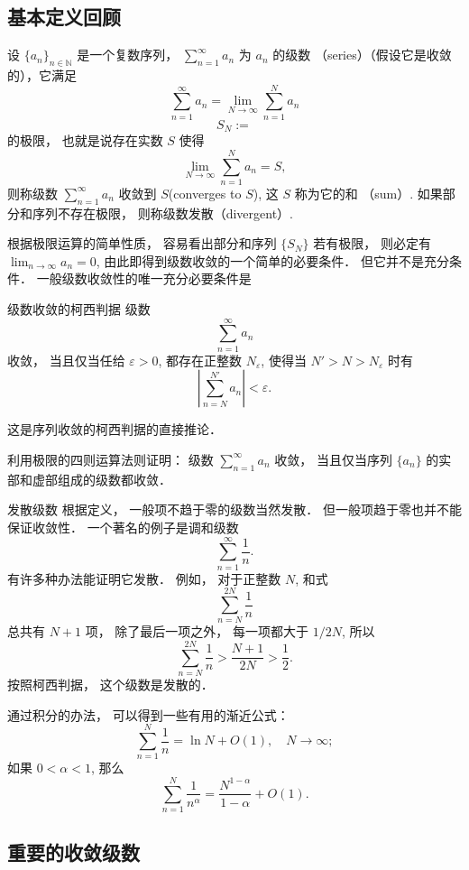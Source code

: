 


\subsection{基本定义回顾}
设 $\{a_n\}_{n\in\mathbb{N}}$ 是一个复数序列， $\sum_{n=1}^\infty a_n$ 为 $a_n$ 的级数 （series）（假设它是收敛的），它满足
$$
\sum_{n=1}^\infty a_n = \lim_{N \to \infty} \sum_{n=1}^N a_n
$$
\[
S_N:=
\]
的极限， 也就是说存在实数 $S$ 使得
\[
\lim_{N\to\infty}\sum_{n=1}^N a_n=S,
\] 
则称级数 $\sum_{n=1}^\infty a_n$ 收敛到 $S$(converges to $S$), 这 $S$ 称为它的和 （sum）. 如果部分和序列不存在极限， 则称级数发散（divergent）. 


根据极限运算的简单性质， 容易看出部分和序列 $\{S_N\}$ 若有极限， 则必定有 $\lim_{n\to\infty}a_n=0$, 由此即得到级数收敛的一个简单的必要条件． 但它并不是充分条件． 一般级数收敛性的唯一充分必要条件是
\begin{theorem}{级数收敛的柯西判据}
级数
\[
\sum_{n=1}^\infty a_n
\]
收敛， 当且仅当任给 $\varepsilon>0$, 都存在正整数 $N_\varepsilon$, 使得当 $N'>N>N_\varepsilon$ 时有
$$
\left|\sum_{n=N}^{N'} a_n\right|<\varepsilon.
$$
\end{theorem}
这是序列收敛的柯西判据的直接推论．

\begin{exercise}{}
利用极限的四则运算法则证明： 级数 $\sum_{n=1}^\infty a_n$ 收敛， 当且仅当序列 $\{a_n\}$ 的实部和虚部组成的级数都收敛．
\end{exercise}

\begin{example}{发散级数}
根据定义， 一般项不趋于零的级数当然发散． 但一般项趋于零也并不能保证收敛性． 一个著名的例子是调和级数
$$
\sum_{n=1}^\infty\frac{1}{n}.
$$
有许多种办法能证明它发散． 例如， 对于正整数 $N$, 和式
$$
\sum_{n=N}^{2N}\frac{1}{n}
$$
总共有 $N+1$ 项， 除了最后一项之外， 每一项都大于 $1/2N$, 所以
$$
\sum_{n=N}^{2N}\frac{1}{n}>\frac{N+1}{2N}>\frac{1}{2}.
$$
按照柯西判据， 这个级数是发散的．

通过积分的办法， 可以得到一些有用的渐近公式：
$$
\sum_{n=1}^{N}\frac{1}{n}=\ln N+O(1),\quad N\to\infty;
$$
如果 $0<\alpha<1$, 那么
$$
\sum_{n=1}^{N}\frac{1}{n^\alpha}=\frac{N^{1-\alpha}}{1-\alpha}+O(1).
$$
\end{example}

\subsection{重要的收敛级数}

